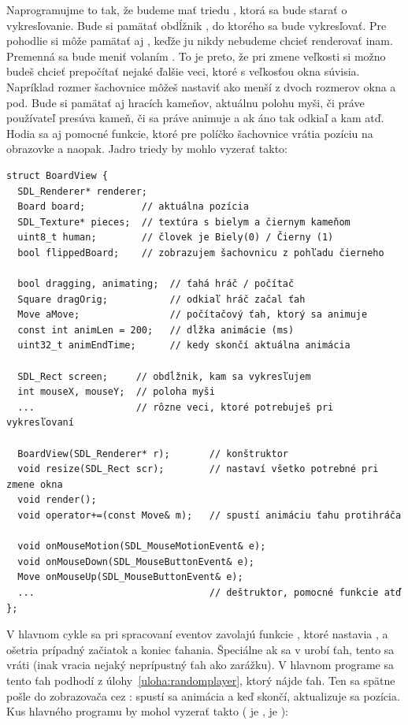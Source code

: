 Naprogramujme to tak, že budeme mať triedu , ktorá sa bude starať o vykresľovanie. Bude si pamätať obdĺžnik
, do ktorého sa bude vykresľovať. Pre pohodlie si môže pamätať aj 
, keďže ju nikdy nebudeme chcieť renderovať inam. Premenná  sa bude meniť
volaním . To je preto, že pri zmene veľkosti si možno budeš chcieť prepočítať
nejaké ďalšie veci, ktoré s veľkosťou okna súvisia. Napríklad rozmer šachovnice môžeš
nastaviť ako menší z dvoch rozmerov okna a pod. Bude si pamätať aj  hracích kameňov, 
aktuálnu polohu myši, či práve používateľ presúva kameň, či sa práve animuje a ak áno tak odkiaľ a kam atď. 
Hodia sa aj pomocné funkcie, ktoré pre políčko šachovnice vrátia pozíciu na obrazovke a naopak.
Jadro triedy by mohlo vyzerať takto:

\begin{lstlisting}
struct BoardView {
  SDL_Renderer* renderer;
  Board board;          // aktuálna pozícia
  SDL_Texture* pieces;  // textúra s bielym a čiernym kameňom
  uint8_t human;        // človek je Biely(0) / Čierny (1)
  bool flippedBoard;    // zobrazujem šachovnicu z pohľadu čierneho

  bool dragging, animating;  // ťahá hráč / počítač
  Square dragOrig;           // odkiaľ hráč začal ťah
  Move aMove;                // počítačový ťah, ktorý sa animuje
  const int animLen = 200;   // dĺžka animácie (ms)
  uint32_t animEndTime;      // kedy skončí aktuálna animácia

  SDL_Rect screen;     // obdĺžnik, kam sa vykresľujem
  int mouseX, mouseY;  // poloha myši
  ...                  // rôzne veci, ktoré potrebuješ pri vykresľovaní

  BoardView(SDL_Renderer* r);       // konštruktor
  void resize(SDL_Rect scr);        // nastaví všetko potrebné pri zmene okna
  void render();
  void operator+=(const Move& m);   // spustí animáciu ťahu protihráča

  void onMouseMotion(SDL_MouseMotionEvent& e);
  void onMouseDown(SDL_MouseButtonEvent& e);
  Move onMouseUp(SDL_MouseButtonEvent& e);
  ...                               // deštruktor, pomocné funkcie atď
};
\end{lstlisting}

V hlavnom cykle sa pri spracovaní eventov zavolajú funkcie , ktoré nastavia ,  a ošetria prípadný začiatok a koniec ťahania.
Špeciálne ak sa v  urobí ťah, tento sa vráti (inak vracia nejaký neprípustný ťah ako zarážku). V hlavnom programe sa tento ťah podhodí 
z úlohy~\ref{uloha:randomplayer}, ktorý nájde ťah. Ten sa spätne pošle do zobrazovača cez : spustí sa animácia a keď skončí, aktualizuje sa pozícia.
Kus hlavného programu by mohol vyzerať takto ( je ,  je ):\\

